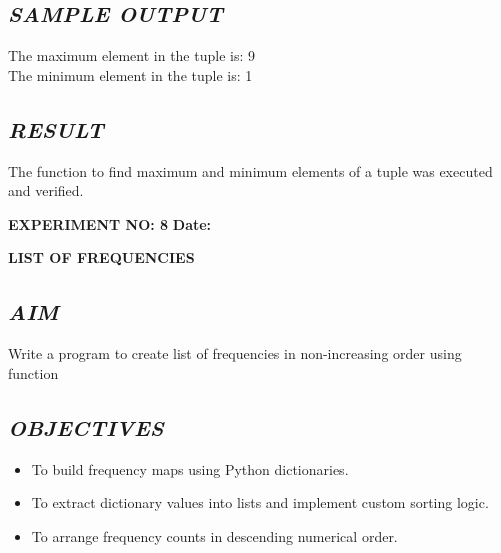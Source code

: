 \documentclass[11pt,a4paper]{article}
\begin{document}
\subsection*{\textit{SAMPLE OUTPUT}}
\begin{tcolorbox}[colback=black!85,colframe=navyblue,title=\textbf{Terminal Output},coltitle=white,fonttitle=\bfseries\small]
\small\ttfamily\color{green!30!white}
The maximum element in the tuple is: 9\\
The minimum element in the tuple is: 1
\end{tcolorbox}

\subsection*{\textit{RESULT}}
The function to find maximum and minimum elements of a tuple was executed and verified.

\newpage

\noindent
\textbf{\large EXPERIMENT NO: 8} \hfill \textbf{\large Date: \underline{\hspace{3cm}}}

\vspace{0.2cm}
\begin{center}
{\Huge \textbf{\textcolor{navyblue}{LIST OF FREQUENCIES}}}
\end{center}
\vspace{0.3cm}

\subsection*{\textit{AIM}}
Write a program to create list of frequencies in non-increasing order using function

\subsection*{\textit{OBJECTIVES}}
\begin{itemize}
  \item To build frequency maps using Python dictionaries.
  \item To extract dictionary values into lists and implement custom sorting logic.
  \item To arrange frequency counts in descending numerical order.
\end{itemize}
\end{document}

